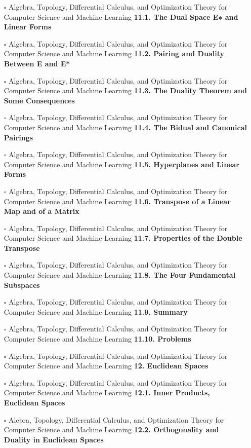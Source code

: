 \documentclass[a4, landscape, 12pt]{article}
\newcommand{\checkbox}{$\square$}%
\begin{document}
\begin{itemize}
{}
\item [\checkbox]  Algebra, Topology, Differential Calculus, and Optimization Theory for Computer Science and Machine Learning \textbf{ 11.1. The Dual Space E∗ and Linear Forms
}
\item [\checkbox]  Algebra, Topology, Differential Calculus, and Optimization Theory for Computer Science and Machine Learning \textbf{ 11.2. Pairing and Duality Between E and E*
}
\item [\checkbox]  Algebra, Topology, Differential Calculus, and Optimization Theory for Computer Science and Machine Learning \textbf{ 11.3. The Duality Theorem and Some Consequences
}
\item [\checkbox]  Algebra, Topology, Differential Calculus, and Optimization Theory for Computer Science and Machine Learning \textbf{ 11.4. The Bidual and Canonical Pairings
}
\item [\checkbox]  Algebra, Topology, Differential Calculus, and Optimization Theory for Computer Science and Machine Learning \textbf{ 11.5. Hyperplanes and Linear Forms
}
\item [\checkbox]  Algebra, Topology, Differential Calculus, and Optimization Theory for Computer Science and Machine Learning \textbf{ 11.6. Transpose of a Linear Map and of a Matrix
}
\item [\checkbox]  Algebra, Topology, Differential Calculus, and Optimization Theory for Computer Science and Machine Learning \textbf{ 11.7. Properties of the Double Transpose
}
\item [\checkbox]  Algebra, Topology, Differential Calculus, and Optimization Theory for Computer Science and Machine Learning \textbf{ 11.8. The Four Fundamental Subspaces
}
\item [\checkbox]  Algebra, Topology, Differential Calculus, and Optimization Theory for Computer Science and Machine Learning \textbf{ 11.9. Summary
}
\item [\checkbox]  Algebra, Topology, Differential Calculus, and Optimization Theory for Computer Science and Machine Learning \textbf{ 11.10. Problems
}
\item [\checkbox]  Algebra, Topology, Differential Calculus, and Optimization Theory for Computer Science and Machine Learning \textbf{ 12. Euclidean Spaces
}
\item [\checkbox]  Algebra, Topology, Differential Calculus, and Optimization Theory for Computer Science and Machine Learning \textbf{ 12.1. Inner Products, Euclidean Spaces
}
\item [\checkbox]  Alebra, Topology, Differential Calculus, and Optimization Theory for Computer Science and Machine Learning \textbf{ 12.2. Orthogonality and Duality in Euclidean Spaces
}
\end{itemize}
\end{document}
